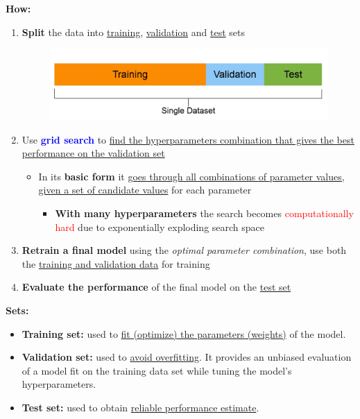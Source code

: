 \documentclass[12pt, a4paper]{article}
\begin{document}
\textbf{How:}
\begin{enumerate}
  \item \textbf{Split} the data into \uline{training}, \uline{validation} and \uline{test} sets
  \begin{figure}[H]
    \centering  %
      \includegraphics[width=0.6\columnwidth]{images/data-split.png}
      \label{fig:data-split}
  \end{figure}
  \item Use \textbf{\textcolor{blue}{grid search}} to \uline{find the hyperparameters combination that gives the best performance on the validation set}
  \begin{itemize}
    \item In its \textbf{basic form} it \uline{goes through all combinations of parameter values, given a set of candidate values} for each parameter
    \begin{itemize}
      \item \textbf{With many hyperparameters} the search becomes \textcolor{red}{computationally hard} due to exponentially exploding search space
    \end{itemize}
  \end{itemize}
  \item \textbf{Retrain a final model} using the \textit{optimal parameter combination}, use both the \uline{training and validation data} for training
  \item \textbf{Evaluate the performance} of the final model on the \uline{test set}
\end{enumerate}


\textbf{Sets:}
\begin{itemize}
  \item \textbf{Training set:} used to \uline{fit (optimize) the parameters (weights)} of the model.
  \item \textbf{Validation set:} used to \uline{avoid overfitting}. It provides an unbiased evaluation of a model fit on the training data set while tuning the model's hyperparameters.
  \item \textbf{Test set:} used to obtain \uline{reliable performance estimate}.
\end{itemize}

\bigskip
\end{document}
